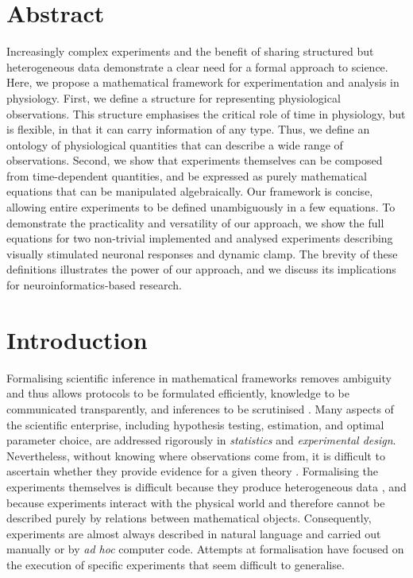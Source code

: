 
\section*{Abstract}

Increasingly complex experiments and the benefit of sharing structured
but heterogeneous data demonstrate a clear need for a formal approach
to science.  Here, we propose a mathematical framework for
experimentation and analysis in physiology. First, we define a
structure for representing physiological observations. This structure
emphasises the critical role of time in physiology, but is flexible,
in that it can carry information of any type. Thus, we define an
ontology of physiological quantities that can describe a wide range of
observations. Second, we show that experiments themselves can be
composed from time-dependent quantities, and be expressed as purely
mathematical equations that can be manipulated algebraically. Our
framework is concise, allowing entire experiments to be defined
unambiguously in a few equations. To demonstrate the practicality and
versatility of our approach, we show the full equations for two
non-trivial implemented and analysed experiments describing visually
stimulated neuronal responses and dynamic clamp. The brevity of these
definitions illustrates the power of our approach, and we discuss its
implications for neuroinformatics-based research.

\pagebreak

\section*{Introduction}

Formalising scientific inference in mathematical frameworks removes
ambiguity and thus allows protocols to be formulated efficiently,
knowledge to be communicated transparently, and inferences to be
scrutinised \citep{Soldatova2006, Jaynes2003, Krantz1971}. Many
aspects of the scientific enterprise, including hypothesis testing,
estimation, and optimal parameter choice, are addressed rigorously in
\emph{statistics} and \emph{experimental design}. Nevertheless,
without knowing where observations come from, it is difficult to
ascertain whether they provide evidence for a given theory
\citep{Pool2002,MacKenzie-Graham2008,VanHorn2009}. Formalising the
experiments themselves is difficult because they produce heterogeneous
data \citep{Tukey1962}, and because experiments interact with the
physical world and therefore cannot be described purely by relations
between mathematical objects. Consequently, experiments are 
almost always described in natural language and carried out manually or by
\emph{ad hoc} computer code. Attempts at formalisation have focused on the
execution of specific experiments \citep{Jenkins1989, Manduchi1990, King2004}
that seem difficult to generalise.

